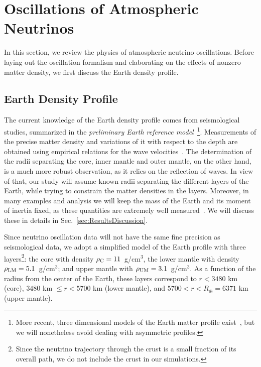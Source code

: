 \section{Oscillations of Atmospheric Neutrinos}
\label{sec:AtmoNu}


In this section, we review the physics of atmospheric neutrino oscillations.
Before laying out the oscillation formalism and elaborating on the effects of nonzero matter density, we first discuss the Earth density profile.

\subsection{Earth Density Profile}

The current knowledge of the Earth density profile comes from seismological studies, summarized in the \emph{preliminary Earth reference model}~\cite{Dziewonski:1981xy}\footnote{More recent, three dimensional models of the Earth matter profile exist~\cite{REM}, but we will nonetheless avoid dealing with asymmetric profiles.}.
Measurements of the precise matter density and variations of it with respect to the depth are obtained using empirical relations for the wave velocities~\cite{Geller:2001ix}.
The determination of the radii separating the core, inner mantle and outer mantle, on the other hand, is a much more robust observation, as it relies on the reflection of waves.
In view of that, our study will assume known radii separating the different layers of the Earth, while trying to constrain the matter densities in the layers.
Moreover, in many examples and analysis we will keep the mass of the Earth and its moment of inertia fixed, as these quantities are extremely well measured~\cite{ries1992progress, Rosi:2014kva, williams1994contributions, chen2015consistent}.
We will discuss these in details in Sec.~\ref{sec:ResultsDiscussion}.

Since neutrino oscillation data will not have the same fine precision as seismological data, we adopt a simplified model of the Earth profile with three layers\footnote{Since the neutrino trajectory through the crust is a small fraction of its overall path, we do not include the crust in our simulations.}: the core with density $\rho_{\rm C}=11$~g/cm$^3$, the lower mantle with density $\rho_{\rm LM}=5.1$~g/cm$^3$; and upper mantle with $\rho_{\rm UM}=3.1$~g/cm$^3$. As a function of the radius from the center of the Earth, these layers correspond to $r < 3480$ km (core), $3480$ km $\leq r < 5700$ km (lower mantle), and $5700 < r < R_{\scriptscriptstyle\oplus} = 6371$ km (upper mantle).

